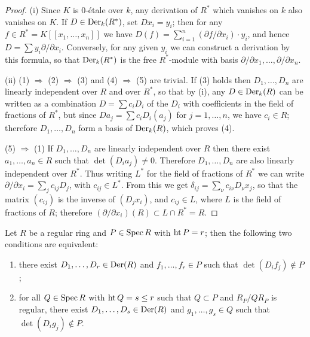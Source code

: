 \begin{proof}
(i) Since $K$ is 0-\'etale over $k$, any derivation of $R^*$ which vanishes on $k$ also
vanishes on $K$. If $D \in \operatorname{Der}_k(R^*)$, set $Dx_i = y_i$; then for any
$f \in R^* = K[[x_1, \ldots, x_n]]$ we have $D(f) = \sum_{i=1}^{n}(\partial f/\partial x_i) \cdot y_i$,
and hence $D = \sum y_i \partial/\partial x_i$. Conversely, for any given $y_i$ we can
construct a derivation by this formula, so that $\operatorname{Der}_k(R^*)$ is the free $R^*$-module
with basis $\partial/\partial x_1, \ldots, \partial/\partial x_n$.

(ii) (1) $\Rightarrow$ (2) $\Rightarrow$ (3) and (4) $\Rightarrow$ (5) are trivial. If (3) holds then
$D_1, \ldots, D_n$ are linearly independent over $R$ and over $R^*$, so that by (i), any
$D \in \operatorname{Der}_k(R)$ can be written as a combination $D = \sum c_iD_i$ of the $D_i$ with
coefficients in the field of fractions of $R^*$, but since $Da_j = \sum c_iD_i(a_j)$ for
$j = 1, \ldots, n$, we have $c_i \in R$; therefore $D_1, \ldots, D_n$ form a basis of
$\operatorname{Der}_k(R)$, which proves (4).

(5) $\Rightarrow$ (1) If $D_1, \ldots, D_n$ are linearly independent over $R$ then there exist
$a_1, \ldots, a_n \in R$ such that $\det(D_ia_j) \ne 0$. Therefore $D_1, \ldots, D_n$ are also
linearly independent over $R^*$. Thus writing $L^*$ for the field of fractions of
$R^*$ we can write $\partial/\partial x_i = \sum_j c_{ij}D_j$, with $c_{ij} \in L^*$. From this we
get $\delta_{ij} = \sum_\nu c_{i\nu}D_\nu x_j$, so that the matrix $(c_{ij})$ is the inverse of
$(D_jx_i)$, and $c_{ij} \in L$, where $L$ is the field of fractions of $R$; therefore
$(\partial/\partial x_i)(R) \subset L \cap R^* = R$.
\end{proof}

\begin{lemma}\label{lem:30.2}
Let $R$ be a regular ring and $P \in \operatorname{Spec} R$ with $\operatorname{ht} P = r$; then the following
two conditions are equivalent:
\begin{enumerate}[(1)]
  \item there exist $D_1, \ldots, D_r \in \operatorname{Der}(R)$ and $f_1, \ldots, f_r \in P$ such that
        $\det(D_if_j) \notin P$;
  \item for all $Q \in \operatorname{Spec} R$ with $\operatorname{ht} Q = s \le r$ such that $Q \subset P$ and
        $R_P/QR_P$ is regular, there exist $D_1, \ldots, D_s \in \operatorname{Der}(R)$ and
        $g_1, \ldots, g_s \in Q$ such that $\det(D_ig_j) \notin P$.
\end{enumerate}
\end{lemma}

